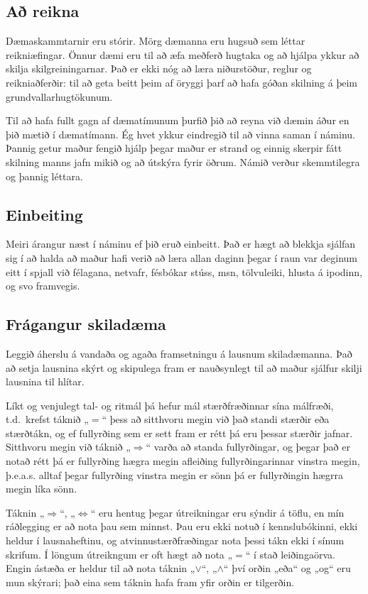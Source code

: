 \documentclass[a4paper,10pt,icelandic]{sphinxmanual}
\begin{document}
\subsection{Að reikna}
\label{\detokenize{vidauki:a-reikna}}
Dæmaskammtarnir eru stórir.  Mörg dæmanna eru hugsuð
sem léttar reikniæfingar.
Önnur dæmi eru til að æfa
meðferð hugtaka og að hjálpa ykkur að skilja
skilgreiningarnar.  Það er ekki nóg að læra niðurstöður, reglur og
reikniaðferðir: til að geta beitt þeim af öryggi þarf að hafa góðan
skilning á þeim grundvallarhugtökunum.

Til að hafa fullt gagn af dæmatímunum þurfið þið að reyna við dæmin
áður en þið mætið í dæmatímann.
Ég hvet ykkur eindregið til að vinna saman í náminu.  Þannig getur
maður fengið hjálp þegar maður er strand og
einnig skerpir fátt skilning manns  jafn mikið og að útskýra
fyrir öðrum.  Námið verður  skemmtilegra og þannig
léttara.


\subsection{Einbeiting}
\label{\detokenize{vidauki:einbeiting}}
Meiri árangur næst í náminu ef þið eruð einbeitt.
Það er hægt að blekkja sjálfan sig í að halda að maður hafi verið að
læra allan daginn þegar í raun var deginum eitt í spjall við félagana,
netvafr, fésbókar stúss, msn, tölvuleiki, hlusta á ipodinn, og
svo framvegis.


\subsection{Frágangur skiladæma}
\label{\detokenize{vidauki:id1}}
Leggið áherslu á vandaða og agaða framsetningu á lausnum
skiladæmanna.  Það að setja lausnina skýrt og skipulega fram er
nauðsynlegt til að maður sjálfur skilji lausnina til hlítar.

Líkt og venjulegt tal- og ritmál þá hefur mál stærðfræðinnar sína
málfræði, t.d. krefst táknið „\(=\)“ þess að sitthvoru megin við
það standi stærðir eða stærðtákn, og ef fullyrðing sem er sett fram er
rétt þá eru þessar stærðir jafnar. Sitthvoru megin við táknið
„\(\Rightarrow\)“ varða að standa fullyrðingar, og þegar það er
notað rétt þá er fullyrðing hægra megin afleiðing fullyrðingarinnar
vinstra megin, þ.e.a.s. alltaf þegar fullyrðing vinstra megin er sönn þá
er fullyrðingin hægrra megin líka sönn.

Táknin „\(\Rightarrow\)“, „\(\Leftrightarrow\)“ eru hentug
þegar útreikningar eru sýndir á töflu, en mín ráðlegging er að nota þau
sem minnst. Þau eru ekki notuð í kennslubókinni, ekki heldur í
lausnaheftinu, og atvinnustærðfræðingar nota þessi tákn ekki í sínum
skrifum. Í löngum útreikngum er oft hægt að nota „\(=\)“ í stað
leiðingaörva. Engin ástæða er heldur til að nota táknin
„\(\vee\)“, „\(\wedge\)“ því orðin „eða“ og „og“ eru mun
skýrari; það eina sem táknin hafa fram yfir orðin er tilgerðin.
\end{document}
